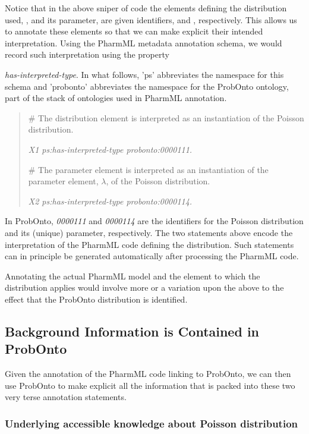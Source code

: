 Notice that in the above sniper of code the elements defining the distribution used, ,  
and its parameter,  are given identifiers,  and , respectively.
This allows us to annotate these elements so that we can make explicit their intended interpretation. Using the PharmML metadata annotation schema, we would record such interpretation using the property {\emph{has-interpreted-type}. In what follows, 'ps' abbreviates the namespace for this schema and 'probonto' abbreviates the namespace for the ProbOnto ontology, part of the stack of ontologies used in PharmML annotation. 

\begin{quote}
\# The distribution element is interpreted as an instantiation of the Poisson distribution.

\emph{X1 ps:has-interpreted-type probonto:0000111.}

\# The parameter element is interpreted as an instantiation of the parameter element, $\lambda$, of the Poisson distribution.

\emph{X2 ps:has-interpreted-type probonto:0000114.}
\end{quote}

In ProbOnto, \emph{0000111} and \emph{0000114} are the identifiers for the Poisson distribution 
and its (unique) parameter, respectively. The two statements above encode the interpretation 
of the PharmML code defining the distribution. Such statements can in principle be generated automatically 
after processing the PharmML code.

Annotating the actual PharmML model and the element to which the distribution applies would involve 
more or a variation upon the above to the effect that the ProbOnto distribution is identified.

\subsection{Background Information is Contained in ProbOnto}

Given the annotation of the PharmML code linking to ProbOnto, we can then use ProbOnto to make explicit all the information that is packed into these two very terse annotation statements.

\subsubsection*{Underlying accessible knowledge about Poisson distribution}

}
